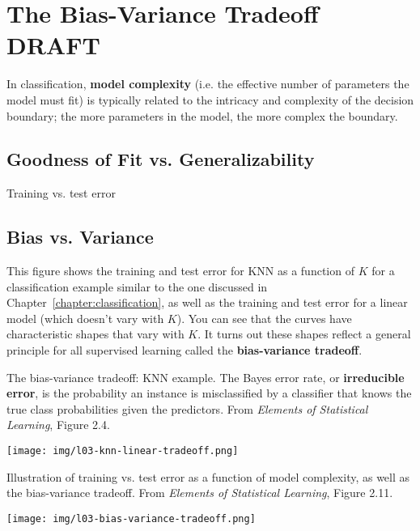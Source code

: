 \chapter{The Bias-Variance Tradeoff {\color{red} DRAFT} \label{chapter:biasvariance}}

In classification, \textbf{model complexity} (i.e. the effective number of parameters the model must fit) is typically related to the intricacy and complexity of the decision boundary; the more parameters in the model, the more complex the boundary.

\section{Goodness of Fit vs. Generalizability}

Training vs. test error

\section{Bias vs. Variance}

This figure shows the training and test error for KNN as a function of $K$ for a classification example similar to the one discussed in Chapter~\ref{chapter:classification}, as well as the training and test error for a linear model (which doesn't vary with $K$). You can see that the curves have characteristic shapes that vary with $K$. It turns out these shapes reflect a general principle for all supervised learning called the \textbf{bias-variance tradeoff}. 

The bias-variance tradeoff: KNN example. The Bayes error rate, or \textbf{irreducible error}, is the probability an instance is misclassified by a classifier that knows the true class probabilities given the predictors. From \emph{Elements of Statistical Learning}, Figure 2.4.

\begin{center}
\texttt{[image: img/l03-knn-linear-tradeoff.png]}
\end{center}

Illustration of training vs. test error as a function of model complexity, as well as the bias-variance tradeoff. From \emph{Elements of Statistical Learning}, Figure 2.11.

\begin{center}
\texttt{[image: img/l03-bias-variance-tradeoff.png]}
\end{center}

